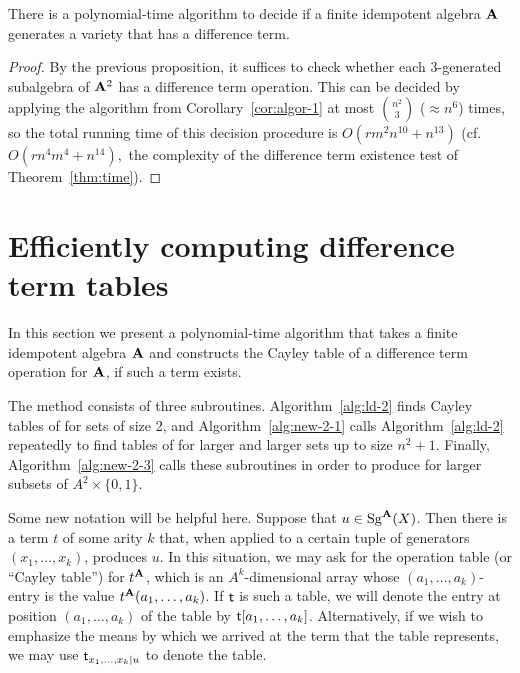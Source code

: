 \documentclass{ws-ijac}
\begin{document}
\begin{corollary}
  There is a polynomial-time algorithm to decide if a finite idempotent algebra $\mathbf{A}$ generates a variety that has a difference term.
\end{corollary}

\begin{proof}
  By the previous proposition, it suffices to check whether each 3-generated subalgebra of
  $\mathbf{A}^2$ has a difference term operation. This can be decided by applying the
  algorithm from Corollary~\ref{cor:algor-1} at most $\binom{n^2}{3}$ ($\approx n^6$) times,
  so the total running time of this decision procedure is $O(rm^2n^{10} + n^{13})$ (cf.~$O(rn^4m^4 + n^{14}),$
  the complexity of the difference term existence test of Theorem~\ref{thm:time}).
\end{proof}

\section{Efficiently computing difference term tables}
\label{sec:comp-diff-term}
In this section we present a polynomial-time algorithm that takes
a finite idempotent algebra $\mathbf{A}$ and constructs the Cayley table of
a difference term operation for $\mathbf{A}$, if such a term exists.

The method consists of three subroutines.
Algorithm~\ref{alg:ld-2} finds Cayley tables of \ldtos for sets of size 2,
and Algorithm~\ref{alg:new-2-1} calls Algorithm~\ref{alg:ld-2} repeatedly to find
tables of \ldtos for larger and larger sets up to size $n^2+1$.
Finally, Algorithm~\ref{alg:new-2-3}
calls these subroutines in order to produce \ldtos for larger subsets of
$A^2 \times \{0,1\}$.

Some new notation will be helpful here.  Suppose that $ u \in \operatorname{Sg}^{\mathbf{A}}(X)$.
Then there is a term $t$ of some arity $k$ that, when applied to a certain tuple of
generators $(x_1, \dots, x_k)$, produces $u$.
In this situation, we may ask for the operation table (or ``Cayley table'')
for $t^{\mathbf{A}}$, which is an $A^k$-dimensional array whose $(a_1, \dots, a_k)$-entry
is the value $t^{\mathbf{A}}(a_1, \dots, a_k)$.
If $\mathsf{t}$ is such a table, we will denote the
entry at position $(a_1, \dots, a_k)$ of the table by $\mathsf{t}[a_1, \dots, a_k]$.
Alternatively, if we wish to emphasize the means by which
we arrived at the term that the table represents, we may use
$\mathsf{t}_{x_1,\dots, x_k \mid u}$ to denote the table.
\end{document}
